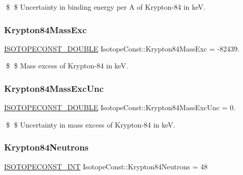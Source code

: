 \$ \$ Uncertainty in binding energy per A of Krypton-\/84 in keV. \mbox{\label{group___isotope_const-_krypton-_kr84_gabb9c47b52c48cd760a8d74eb82249940}} 
\subsubsection{\texorpdfstring{Krypton84\+Mass\+Exc}{Krypton84MassExc}}
{\footnotesize\ttfamily \mbox{\hyperlink{group___isotope_const-_macros_ga8f45a7272ce02c0b4c65c44636ed719a}{I\+S\+O\+T\+O\+P\+E\+C\+O\+N\+S\+T\+\_\+\+D\+O\+U\+B\+LE}} Isotope\+Const\+::\+Krypton84\+Mass\+Exc = -\/82439.}

\$ \$ Mass excess of Krypton-\/84 in keV. \mbox{\label{group___isotope_const-_krypton-_kr84_ga57761cd78b43b2e69c8419a0bc0e0667}} 
\subsubsection{\texorpdfstring{Krypton84\+Mass\+Exc\+Unc}{Krypton84MassExcUnc}}
{\footnotesize\ttfamily \mbox{\hyperlink{group___isotope_const-_macros_ga8f45a7272ce02c0b4c65c44636ed719a}{I\+S\+O\+T\+O\+P\+E\+C\+O\+N\+S\+T\+\_\+\+D\+O\+U\+B\+LE}} Isotope\+Const\+::\+Krypton84\+Mass\+Exc\+Unc = 0.}

\$ \$ Uncertainty in mass excess of Krypton-\/84 in keV. \mbox{\label{group___isotope_const-_krypton-_kr84_ga9500b49cdac918d3d5ecd9a29003fe9f}} 
\subsubsection{\texorpdfstring{Krypton84\+Neutrons}{Krypton84Neutrons}}
{\footnotesize\ttfamily \mbox{\hyperlink{group___isotope_const-_macros_ga5f18360b3e99483a35c32d789e62621c}{I\+S\+O\+T\+O\+P\+E\+C\+O\+N\+S\+T\+\_\+\+I\+NT}} Isotope\+Const\+::\+Krypton84\+Neutrons = 48}


